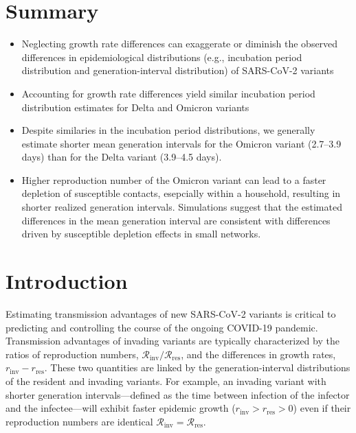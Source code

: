 \documentclass[12pt]{article}
\date{\today}
\newcommand{\Rx}[1]{\ensuremath{{\mathcal R}_{#1}}\xspace}
\newcommand{\Rres}{\Rx{\mathrm{res}}}
\newcommand{\Rinv}{\Rx{\mathrm{inv}}}
\newcommand{\rx}[1]{\ensuremath{{r}_{#1}}\xspace}
\newcommand{\rres}{\rx{\mathrm{res}}}
\newcommand{\rinv}{\rx{\mathrm{inv}}}
\begin{document}
\begin{flushleft}{
	\Large
	\textbf{}
}
\bigskip

\section*{Summary}

\begin{itemize}
  \item Neglecting growth rate differences can exaggerate or diminish the observed differences in epidemiological distributions (e.g., incubation period distribution and generation-interval distribution) of SARS-CoV-2 variants
  \item Accounting for growth rate differences yield similar incubation period distribution estimates for Delta and Omicron variants
  \item Despite similaries in the incubation period distributions, we generally estimate shorter mean generation intervals for the Omicron variant (2.7--3.9 days) than for the Delta variant (3.9--4.5 days).
  \item Higher reproduction number of the Omicron variant can lead to a faster depletion of susceptible contacts, esepcially within a household, resulting in shorter realized generation intervals. Simulations suggest that the estimated differences in the mean generation interval are consistent with differences driven by susceptible depletion effects in small networks.
\end{itemize}

\end{flushleft}

\pagebreak

\section{Introduction}

Estimating transmission advantages of new SARS-CoV-2 variants is critical to predicting and controlling the course of the ongoing COVID-19 pandemic.
Transmission advantages of invading variants are typically characterized by the ratios of reproduction numbers, $\Rinv/\Rres$, and the differences in growth rates, $\rinv-\rres$.
These two quantities are linked by the generation-interval distributions of the resident and invading variants.
For example, an invading variant with shorter generation intervals---defined as the time between infection of the infector and the infectee---will exhibit faster epidemic growth ($\rinv > \rres > 0$) even if their reproduction numbers are identical  $\Rinv = \Rres$.
\end{document}
